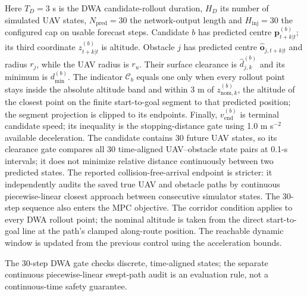 \documentclass[10pt]{article}
\begin{document}
Here $T_D=3$ s is the DWA candidate-rollout duration, $H_D$ its number of simulated UAV states, $N_{\mathrm{pred}}=30$ the network-output length and $H_{\mathrm{inj}}=30$ the configured cap on usable forecast steps. Candidate $b$ has predicted centre $\mathbf p^{(b)}_{t+k|t}$; its third coordinate $z^{(b)}_{t+k|t}$ is altitude. Obstacle $j$ has predicted centre $\hat{\mathbf o}_{j,t+k|t}$ and radius $r_j$, while the UAV radius is $r_u$. Their surface clearance is $\hat d^{(b)}_{j,k}$ and its minimum is $d_{\min}^{(b)}$. The indicator $\mathcal C_b$ equals one only when every rollout point stays inside the absolute altitude band and within 3 m of $z_{\mathrm{nom},k}^{(b)}$, the altitude of the closest point on the finite start-to-goal segment to that predicted position; the segment projection is clipped to its endpoints. Finally, $v_{\mathrm{end}}^{(b)}$ is terminal candidate speed; its inequality is the stopping-distance gate using 1.0 m s$^{-2}$ available deceleration. The candidate contains 30 future UAV states, so its clearance gate compares all 30 time-aligned UAV--obstacle state pairs at 0.1-s intervals; it does not minimize relative distance continuously between two predicted states. The reported collision-free-arrival endpoint is stricter: it independently audits the saved true UAV and obstacle paths by continuous piecewise-linear closest approach between consecutive simulator states. The 30-step sequence also enters the MPC objective. The corridor condition applies to every DWA rollout point; the nominal altitude is taken from the direct start-to-goal line at the path's clamped along-route position. The reachable dynamic window is updated from the previous control using the acceleration bounds.

\noindent The 30-step DWA gate checks discrete, time-aligned states; the separate continuous piecewise-linear swept-path audit is an evaluation rule, not a continuous-time safety guarantee.

\end{document}
